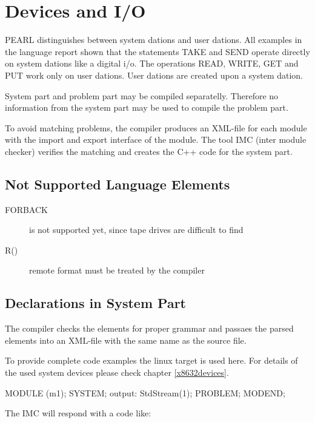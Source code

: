 \chapter{Devices and I/O}

PEARL distinguishes between system dations and user dations.
All examples in the language report shown that the statements TAKE and SEND
operate directly on system dations like a digital i/o.
The operations READ, WRITE, GET and PUT work only on user dations.
User dations are created upon a system dation.

System part and problem part may be compiled separatelly. Therefore 
no information from the system part may be used to compile the problem part.

To avoid matching problems, the compiler produces an XML-file for each 
module with the import and export interface of the module.
The tool IMC (inter module checker) verifies the matching and creates the
C++ code for the system part.


\section{Not Supported Language Elements}
\begin{description}
\item[FORBACK] is not supported yet, since tape drives are
   difficult to find
\item[R()] remote format must be treated by the compiler
\end{description}

\section{Declarations in System Part}
The compiler checks the elements for proper grammar and passaes the
parsed elements into an XML-file with the same name as the source file.

To provide complete code examples the linux target is used here.
For details of the used system devices please check chapter \ref{x8632devices}.

\begin{PEARLCode}
MODULE (m1);
SYSTEM;
   output: StdStream(1);
PROBLEM;
MODEND;
\end{PEARLCode}

The IMC will respond with a code like:

